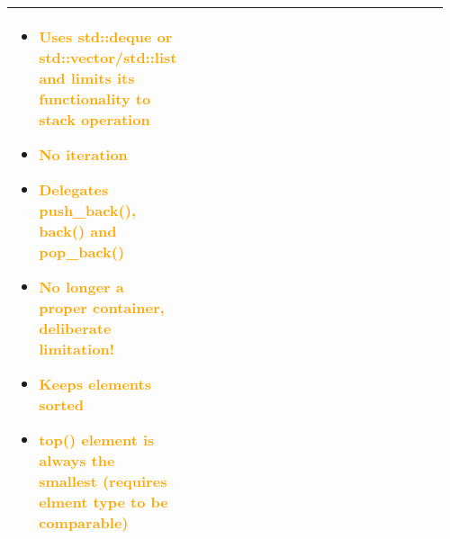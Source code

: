 \documentclass[main.tex,fontsize=8pt,paper=a4,paper=portrait,DIV=calc,]{scrartcl}
\begin{document}
\begin{table}[ht!]
\begin{tabular}{|m{0.2\linewidth}|m{0.755\linewidth}|}
\begin{itemize}
\item \textcolor{orange}{Uses std::deque or std::vector/std::list and limits its functionality to stack operation}
\item \textcolor{orange}{No iteration}
\item \textcolor{orange}{Delegates push\_back(), back() and pop\_back()}
\item \textcolor{orange}{No longer a proper container, \textbf{deliberate limitation!}}
\item \textcolor{orange}{Keeps elements sorted}
\item \textcolor{orange}{top() element is always the smallest (requires elment type to be comparable)}
\vspace{-2mm}
\end{itemize}\\
\hline
\end{tabular}
\end{table}
\pagebreak
\end{document}
